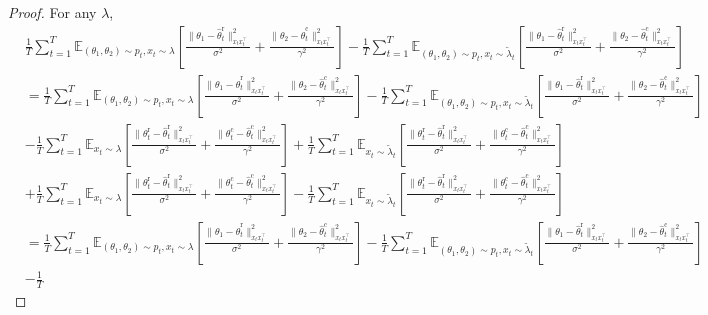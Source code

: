 \documentclass[10pt,a4paper]{amsart}
\newcommand{\hthetact}{\hat{\theta}_t^{\mathrm{c}}}
\newcommand{\hthetart}{\hat{\theta}_t^{\mathrm{r}}}
\begin{document}
\begin{proof}
For any $\lambda$, %
\begin{align*}
     &\frac{1}{T} 
\sum_{t=1}^{T} \mathbb{E}_{(\theta_1, \theta_2) \sim p_t, x_t\sim \lambda} 
\left[\frac{\|\theta_1 - \hthetart\|_{x_t x_t^\top}^2}{\sigma^2} 
+ \frac{\|\theta_2 - \hthetact\|_{x_t x_t^\top}^2}{\gamma^2} \right] 
- \frac{1}{T} \sum_{t=1}^{T} \mathbb{E}_{(\theta_1, \theta_2) \sim p_t, x_t\sim \tilde{\lambda}_t} 
\left[\frac{\|\theta_1 - \hthetart\|_{x_t x_t^\top}^2}{\sigma^2} 
+ \frac{\|\theta_2 - \hthetact\|_{x_t x_t^\top}^2}{\gamma^2} \right]
\\&=\frac{1}{T} 
\sum_{t=1}^{T} \mathbb{E}_{(\theta_1, \theta_2) \sim p_t, x_t\sim \lambda} 
\left[\frac{\|\theta_1 \!-\! \hthetart\|_{x_t x_t^\top}^2}{\sigma^2} 
\!+\! \frac{\|\theta_2\! -\! \hthetact\|_{x_t x_t^\top}^2}{\gamma^2} \right] 
\!-\! \frac{1}{T} \sum_{t=1}^{T} \mathbb{E}_{(\theta_1, \theta_2) \sim p_t, x_t\sim \tilde{\lambda}_t} 
\left[\frac{\|\theta_1 \!- \!\hthetart\|_{x_t x_t^\top}^2}{\sigma^2} 
\!+\! \frac{\|\theta_2 \!-\! \hthetact\|_{x_t x_t^\top}^2}{\gamma^2} \right]
\\&-\frac{1}{T} 
\sum_{t=1}^{T} \mathbb{E}_{ x_t\sim \lambda} 
\left[\frac{\|\theta_t^\mathrm{r} - \hthetart\|_{x_t x_t^\top}^2}{\sigma^2} 
+ \frac{\|\theta_t^\mathrm{c} - \hthetact\|_{x_t x_t^\top}^2}{\gamma^2} \right] 
+ \frac{1}{T} \sum_{t=1}^{T} \mathbb{E}_{ x_t\sim \tilde{\lambda}_t} 
\left[\frac{\|\theta_t^\mathrm{r} - \hthetart\|_{x_t x_t^\top}^2}{\sigma^2} 
+ \frac{\|\theta_t^\mathrm{c} - \hthetact\|_{x_t x_t^\top}^2}{\gamma^2} \right]
\\&+\frac{1}{T} 
\sum_{t=1}^{T} \mathbb{E}_{ x_t\sim \lambda} 
\left[\frac{\|\theta_t^\mathrm{r} - \hthetart\|_{x_t x_t^\top}^2}{\sigma^2} 
+ \frac{\|\theta_t^\mathrm{c} - \hthetact\|_{x_t x_t^\top}^2}{\gamma^2} \right] 
- \frac{1}{T} \sum_{t=1}^{T} \mathbb{E}_{ x_t\sim \tilde{\lambda}_t} 
\left[\frac{\|\theta_t^\mathrm{r} - \hthetart\|_{x_t x_t^\top}^2}{\sigma^2} 
+ \frac{\|\theta_t^\mathrm{c} - \hthetact\|_{x_t x_t^\top}^2}{\gamma^2} \right]
\\&=\frac{1}{T} 
\sum_{t=1}^{T} \mathbb{E}_{(\theta_1, \theta_2) \sim p_t, x_t\sim \lambda} 
\left[\frac{\|\theta_1 \!-\! \hthetart\|_{x_t x_t^\top}^2}{\sigma^2} 
\!+\! \frac{\|\theta_2 \!-\! \hthetact\|_{x_t x_t^\top}^2}{\gamma^2} \right] 
\!-\! \frac{1}{T} \sum_{t=1}^{T} \mathbb{E}_{(\theta_1, \theta_2) \sim p_t, x_t\sim \tilde{\lambda}_t} 
\left[\frac{\|\theta_1 \!-\! \hthetart\|_{x_t x_t^\top}^2}{\sigma^2} 
\!+\! \frac{\|\theta_2 \!-\! \hthetact\|_{x_t x_t^\top}^2}{\gamma^2} \right]
\\&-\frac{1}{T} 

\end{align*}
\end{proof}
\end{document}
